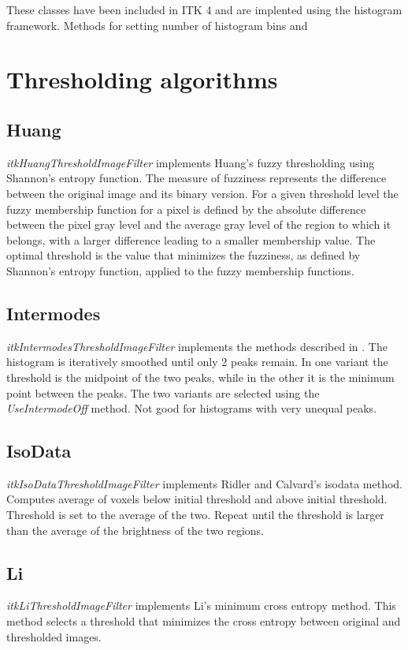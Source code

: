 \documentclass{InsightArticle}
\begin{document}
These classes have been included in ITK 4 and are implented using the
histogram framework. Methods for setting number of histogram bins and 

\section{Thresholding algorithms}
\subsection{Huang}
{\em itkHuangThresholdImageFilter} implements Huang's fuzzy
thresholding using Shannon's entropy
function\cite{huang1995image}. The measure of fuzziness represents the
difference between the original image and its binary version. For a
given threshold level the fuzzy membership function for a pixel is defined by the
absolute difference between the pixel gray level and the average gray
level of the region to which it belongs, with a larger difference
leading to a smaller membership value. The optimal threshold is
the value that minimizes the fuzziness, as defined by Shannon's
entropy function, applied to the fuzzy membership functions.

\subsection{Intermodes}
{\em itkIntermodesThresholdImageFilter} implements the methods
described in \cite{prewitt1965analysis}. The histogram is iteratively
smoothed until only 2 peaks remain. In one variant the threshold is
the midpoint of the two peaks, while in the other it is the minimum
point between the peaks. The two variants are selected using the {\em
  UseIntermodeOff} method. Not good for histograms with very unequal
peaks.
\subsection{IsoData}
{\em itkIsoDataThresholdImageFilter} implements Ridler and Calvard's
\cite{ridler1978picture} isodata method. 
Computes average of voxels below initial threshold and above initial
threshold. Threshold is set to the average of the two. Repeat until
the threshold is larger than the average of the brightness of the two regions.

\subsection{Li}
 {\em itkLiThresholdImageFilter} implements Li's minimum cross entropy
 method\cite{li1993minimum,li1998iterative}. This method selects a
 threshold that minimizes the cross entropy between original and
 thresholded images.
\end{document}
